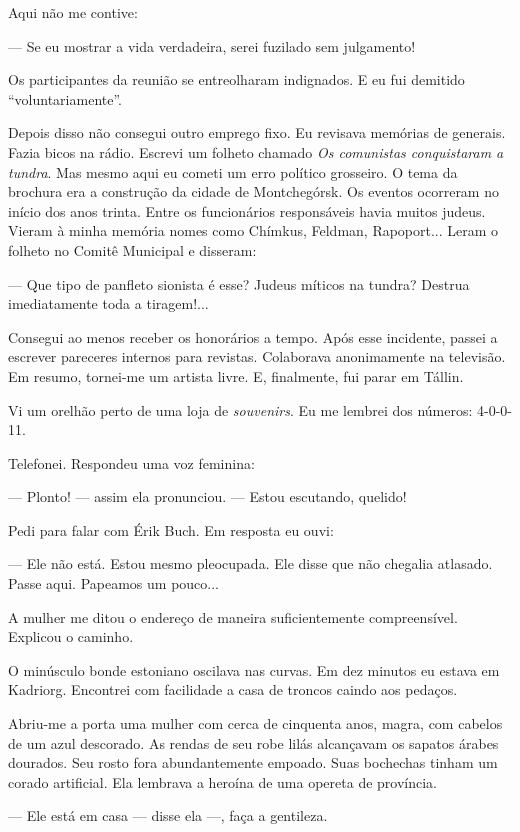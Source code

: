 Aqui não me contive:

--- Se eu mostrar a vida verdadeira, serei fuzilado sem julgamento!

Os participantes da reunião se entreolharam indignados. E eu fui
demitido ``voluntariamente''.

Depois disso não consegui outro emprego fixo. Eu revisava memórias de
generais. Fazia bicos na rádio. Escrevi um folheto chamado \emph{Os
comunistas conquistaram a tundra}. Mas mesmo aqui eu cometi um erro
político grosseiro. O tema da brochura era a construção da cidade de
Montchegórsk. Os eventos ocorreram no início dos anos trinta. Entre os
funcionários responsáveis havia muitos judeus. Vieram à minha memória
nomes como Chímkus, Feldman, Rapoport... Leram o folheto no Comitê
Municipal e disseram:

--- Que tipo de panfleto sionista é esse? Judeus míticos na tundra?
Destrua imediatamente toda a tiragem!...

Consegui ao menos receber os honorários a tempo. Após esse incidente,
passei a escrever pareceres internos para revistas. Colaborava
anonimamente na televisão. Em resumo, tornei-me um artista livre. E,
finalmente, fui parar em Tállin.

Vi um orelhão perto de uma loja de \emph{souvenirs}. Eu me lembrei dos
números: 4-0-0-11.

Telefonei. Respondeu uma voz feminina:

--- Plonto! --- assim ela pronunciou. --- Estou escutando, quelido!

Pedi para falar com Érik Buch. Em resposta eu ouvi:

--- Ele não está. Estou mesmo pleocupada. Ele disse que não chegalia
atlasado. Passe aqui. Papeamos um pouco...

A mulher me ditou o endereço de maneira suficientemente compreensível.
Explicou o caminho.

O minúsculo bonde estoniano oscilava nas curvas. Em dez minutos eu
estava em Kadriorg. Encontrei com facilidade a casa de troncos caindo
aos pedaços.

Abriu-me a porta uma mulher com cerca de cinquenta anos, magra, com
cabelos de um azul descorado. As rendas de seu robe lilás alcançavam os
sapatos árabes dourados. Seu rosto fora abundantemente empoado. Suas
bochechas tinham um corado artificial. Ela lembrava a heroína de uma
opereta de província.

--- Ele está em casa --- disse ela ---, faça a gentileza.

